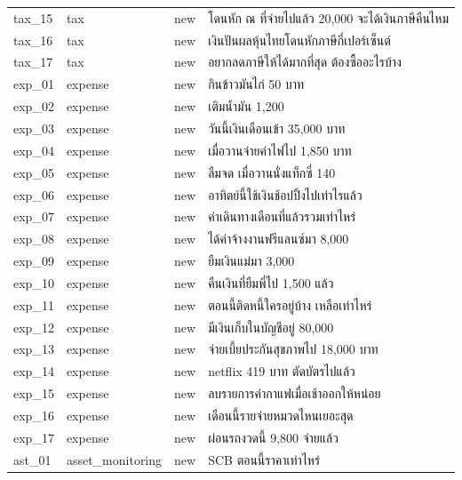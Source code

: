 \documentclass[11pt,a4paper]{article}
\begin{document}
{\begin{longtable}{lllp{9.5cm}}
tax\_\allowbreak{}15 & tax & new & {\thaifont โดนหัก ณ ที่จ่ายไปแล้ว }20,000 {\thaifont จะได้เงินภาษีคืนไหม} \\
tax\_\allowbreak{}16 & tax & new & {\thaifont เงินปันผลหุ้นไทยโดนหักภาษีกี่เปอร์เซ็นต์} \\
tax\_\allowbreak{}17 & tax & new & {\thaifont อยากลดภาษีให้ได้มากที่สุด ต้องซื้ออะไรบ้าง} \\
exp\_\allowbreak{}01 & expense & new & {\thaifont กินข้าวมันไก่ }50 {\thaifont บาท} \\
exp\_\allowbreak{}02 & expense & new & {\thaifont เติมน้ำมัน }1,200 \\
exp\_\allowbreak{}03 & expense & new & {\thaifont วันนี้เงินเดือนเข้า }35,000 {\thaifont บาท} \\
exp\_\allowbreak{}04 & expense & new & {\thaifont เมื่อวานจ่ายค่าไฟไป }1,850 {\thaifont บาท} \\
exp\_\allowbreak{}05 & expense & new & {\thaifont ลืมจด เมื่อวานนั่งแท็กซี่ }140 \\
exp\_\allowbreak{}06 & expense & new & {\thaifont อาทิตย์นี้ใช้เงินช้อปปิ้งไปเท่าไรแล้ว} \\
exp\_\allowbreak{}07 & expense & new & {\thaifont ค่าเดินทางเดือนที่แล้วรวมเท่าไหร่} \\
exp\_\allowbreak{}08 & expense & new & {\thaifont ได้ค่าจ้างงานฟรีแลนซ์มา }8,000 \\
exp\_\allowbreak{}09 & expense & new & {\thaifont ยืมเงินแม่มา }3,000 \\
exp\_\allowbreak{}10 & expense & new & {\thaifont คืนเงินที่ยืมพี่ไป }1,500 {\thaifont แล้ว} \\
exp\_\allowbreak{}11 & expense & new & {\thaifont ตอนนี้ติดหนี้ใครอยู่บ้าง เหลือเท่าไหร่} \\
exp\_\allowbreak{}12 & expense & new & {\thaifont มีเงินเก็บในบัญชีอยู่ }80,000 \\
exp\_\allowbreak{}13 & expense & new & {\thaifont จ่ายเบี้ยประกันสุขภาพไป }18,000 {\thaifont บาท} \\
exp\_\allowbreak{}14 & expense & new & netflix 419 {\thaifont บาท ตัดบัตรไปแล้ว} \\
exp\_\allowbreak{}15 & expense & new & {\thaifont ลบรายการค่ากาแฟเมื่อเช้าออกให้หน่อย} \\
exp\_\allowbreak{}16 & expense & new & {\thaifont เดือนนี้รายจ่ายหมวดไหนเยอะสุด} \\
exp\_\allowbreak{}17 & expense & new & {\thaifont ผ่อนรถงวดนี้ }9,800 {\thaifont จ่ายแล้ว} \\
ast\_\allowbreak{}01 & asset\_\allowbreak{}monitoring & new & SCB {\thaifont ตอนนี้ราคาเท่าไหร่} \\

\end{longtable}}
\end{document}
